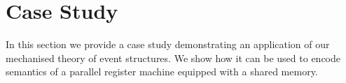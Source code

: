 \section{Case Study}

In this section we provide a case study demonstrating 
an application of our mechanised theory of event structures.
We show how it can be used to encode semantics of 
a parallel register machine equipped with a shared memory.



% 

